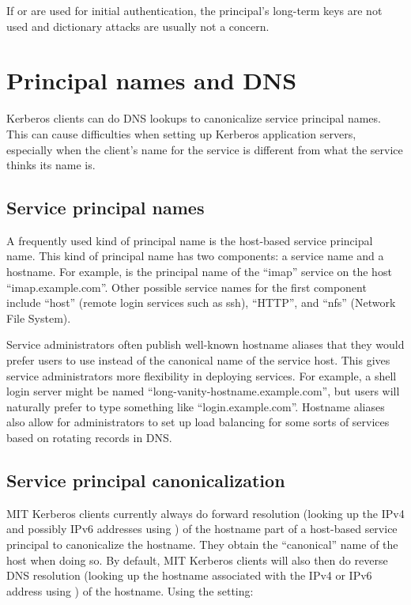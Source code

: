 \documentclass[letterpaper,10pt,english]{sphinxmanual}
\begin{document}
If {\hyperref[\detokenize{admin/pkinit:pkinit}]{}} or {\hyperref[\detokenize{admin/otp:otp-preauth}]{}} are used for
initial authentication, the principal’s long-term keys are not used
and dictionary attacks are usually not a concern.


\chapter{Principal names and DNS}
\label{\detokenize{admin/princ_dns:principal-names-and-dns}}\label{\detokenize{admin/princ_dns::doc}}
Kerberos clients can do DNS lookups to canonicalize service principal
names.  This can cause difficulties when setting up Kerberos
application servers, especially when the client’s name for the service
is different from what the service thinks its name is.


\section{Service principal names}
\label{\detokenize{admin/princ_dns:service-principal-names}}
A frequently used kind of principal name is the host-based service
principal name.  This kind of principal name has two components: a
service name and a hostname.  For example, 
is the principal name of the “imap” service on the host
“imap.example.com”.  Other possible service names for the first
component include “host” (remote login services such as ssh), “HTTP”,
and “nfs” (Network File System).

Service administrators often publish well-known hostname aliases that
they would prefer users to use instead of the canonical name of the
service host.  This gives service administrators more flexibility in
deploying services.  For example, a shell login server might be named
“long-vanity-hostname.example.com”, but users will naturally prefer to
type something like “login.example.com”.  Hostname aliases also allow
for administrators to set up load balancing for some sorts of services
based on rotating  records in DNS.


\section{Service principal canonicalization}
\label{\detokenize{admin/princ_dns:service-principal-canonicalization}}
MIT Kerberos clients currently always do forward resolution (looking
up the IPv4 and possibly IPv6 addresses using ) of
the hostname part of a host-based service principal to canonicalize
the hostname.  They obtain the “canonical” name of the host when doing
so.  By default, MIT Kerberos clients will also then do reverse DNS
resolution (looking up the hostname associated with the IPv4 or IPv6
address using ) of the hostname.  Using the
{\hyperref[\detokenize{admin/conf_files/krb5_conf:krb5-conf-5}]{}} setting:
\end{document}
